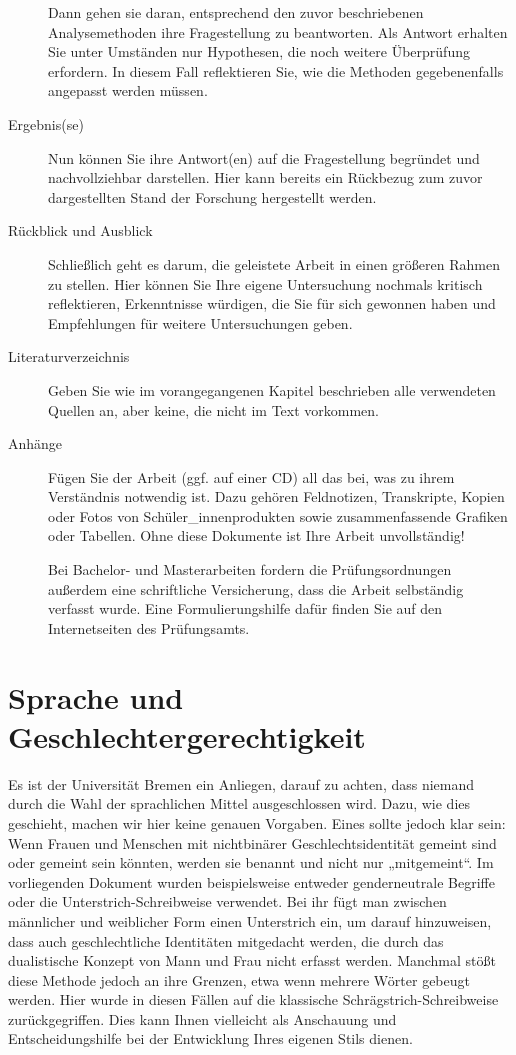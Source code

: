 \documentclass[
  bibliography=totoc,
  oneside,
  12pt,
  a4paper]{scrbook}
\begin{document}
\begin{description}
Dann gehen sie daran, entsprechend den zuvor beschriebenen
Analysemethoden ihre Fragestellung zu beantworten. Als Antwort
erhalten Sie unter Umständen nur Hypothesen, die noch weitere
Überprüfung erfordern. In diesem Fall reflektieren Sie, wie die
Methoden gegebenenfalls angepasst werden müssen.
\item[Ergebnis(se)]
Nun können Sie ihre Antwort(en) auf die Fragestellung begründet und
nachvollziehbar darstellen. Hier kann bereits ein Rückbezug zum
zuvor dargestellten Stand der Forschung hergestellt werden.
\item[Rückblick und Ausblick]
Schließlich geht es darum, die geleistete Arbeit in einen größeren
Rahmen zu stellen. Hier können Sie Ihre eigene Untersuchung nochmals
kritisch reflektieren, Erkenntnisse würdigen, die Sie für sich
gewonnen haben und Empfehlungen für weitere Untersuchungen geben.
\item[Literaturverzeichnis]
Geben Sie wie im vorangegangenen Kapitel beschrieben alle
verwendeten Quellen an, aber keine, die nicht im Text vorkommen.
\item[Anhänge]
Fügen Sie der Arbeit (ggf. auf einer CD) all das bei, was zu ihrem
Verständnis notwendig ist. Dazu gehören Feldnotizen, Transkripte,
Kopien oder Fotos von Schüler\_innenprodukten sowie zusammenfassende
Grafiken oder Tabellen. Ohne diese Dokumente ist Ihre Arbeit
unvollständig!

Bei Bachelor- und Masterarbeiten fordern die Prüfungsordnungen außerdem eine schriftliche Versicherung, dass die Arbeit selbständig verfasst wurde. Eine Formulierungshilfe dafür finden Sie auf den Internetseiten des Prüfungsamts.
\end{description}

\hypertarget{sprache-und-geschlechtergerechtigkeit}{%
\section{Sprache und Geschlechtergerechtigkeit}\label{sprache-und-geschlechtergerechtigkeit}}

Es ist der Universität Bremen ein Anliegen, darauf zu achten, dass niemand durch die Wahl der sprachlichen Mittel ausgeschlossen wird. Dazu, wie dies geschieht, machen wir hier keine genauen Vorgaben. Eines sollte jedoch klar sein: Wenn Frauen und Menschen mit nichtbinärer Geschlechtsidentität gemeint sind oder gemeint sein könnten, werden sie benannt und nicht nur „mitgemeint``. Im vorliegenden Dokument wurden beispielsweise entweder genderneutrale Begriffe oder die Unterstrich-Schreibweise verwendet. Bei ihr fügt man zwischen männlicher und weiblicher Form einen Unterstrich ein, um darauf hinzuweisen, dass auch geschlechtliche Identitäten mitgedacht werden, die durch das dualistische Konzept von Mann und Frau nicht erfasst werden. Manchmal stößt diese Methode jedoch an ihre Grenzen, etwa wenn mehrere Wörter gebeugt werden. Hier wurde in diesen Fällen auf die klassische Schrägstrich-Schreibweise zurückgegriffen. Dies kann Ihnen vielleicht als Anschauung und Entscheidungshilfe bei der Entwicklung Ihres eigenen Stils dienen.
\end{document}
